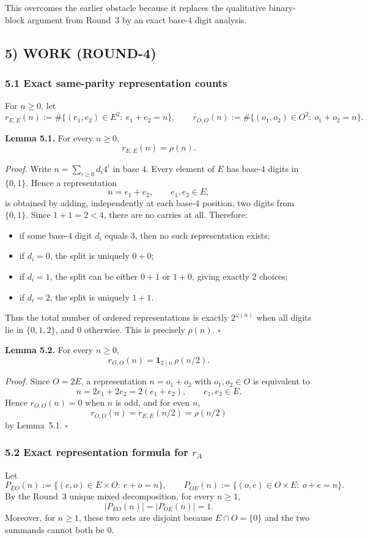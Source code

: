 This overcomes the earlier obstacle because it replaces the qualitative binary-block argument from Round~3 by an exact base-\(4\) digit analysis.

\subsection*{5) WORK (ROUND-4)}

\subsubsection*{5.1 Exact same-parity representation counts}
For \(n\ge 0\), let
\[
r_{E,E}(n):=\#\{(e_1,e_2)\in E^2:\ e_1+e_2=n\},
\qquad
r_{O,O}(n):=\#\{(o_1,o_2)\in O^2:\ o_1+o_2=n\}.
\]

\medskip
\noindent
\textbf{Lemma 5.1.}
For every \(n\ge 0\),
\[
r_{E,E}(n)=\rho(n).
\]

\medskip
\noindent
\emph{Proof.}
Write \(n=\sum_{i\ge 0} d_i4^i\) in base \(4\).
Every element of \(E\) has base-\(4\) digits in \(\{0,1\}\). Hence a representation
\[
n=e_1+e_2,\qquad e_1,e_2\in E,
\]
is obtained by adding, independently at each base-\(4\) position, two digits from \(\{0,1\}\). Since \(1+1=2<4\), there are no carries at all. Therefore:
\begin{itemize}
\item if some base-\(4\) digit \(d_i\) equals \(3\), then no such representation exists;
\item if \(d_i=0\), the split is uniquely \(0+0\);
\item if \(d_i=1\), the split can be either \(0+1\) or \(1+0\), giving exactly \(2\) choices;
\item if \(d_i=2\), the split is uniquely \(1+1\).
\end{itemize}
Thus the total number of ordered representations is exactly \(2^{\omega(n)}\) when all digits lie in \(\{0,1,2\}\), and \(0\) otherwise. This is precisely \(\rho(n)\). \hfill\(\square\)

\medskip
\noindent
\textbf{Lemma 5.2.}
For every \(n\ge 0\),
\[
r_{O,O}(n)=\mathbf 1_{2\mid n}\,\rho(n/2).
\]

\medskip
\noindent
\emph{Proof.}
Since \(O=2E\), a representation \(n=o_1+o_2\) with \(o_1,o_2\in O\) is equivalent to
\[
n=2e_1+2e_2=2(e_1+e_2),\qquad e_1,e_2\in E.
\]
Hence \(r_{O,O}(n)=0\) when \(n\) is odd, and for even \(n\),
\[
r_{O,O}(n)=r_{E,E}(n/2)=\rho(n/2)
\]
by Lemma~5.1. \hfill\(\square\)

\subsubsection*{5.2 Exact representation formula for \(r_A\)}
Let
\[
P_{EO}(n):=\{(e,o)\in E\times O:\ e+o=n\},
\qquad
P_{OE}(n):=\{(o,e)\in O\times E:\ o+e=n\}.
\]
By the Round~3 unique mixed decomposition, for every \(n\ge 1\),
\[
|P_{EO}(n)|=|P_{OE}(n)|=1.
\]
Moreover, for \(n\ge 1\), these two sets are disjoint because \(E\cap O=\{0\}\) and the two summands cannot both be \(0\).

